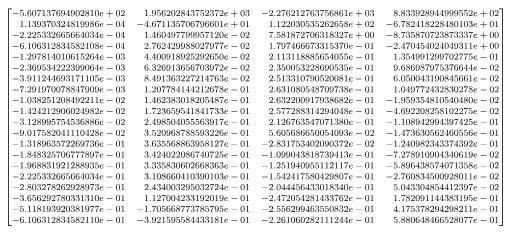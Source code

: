 \documentclass{article}
\begin{document}
\begin{adjustwidth}{-2em}{-2em}
    \[ \medmath{\begin{bmatrix*}[r]
-5.607137694902810e+02 & 1.956202843752372e+03 & -2.276212763756861e+03 & 8.833928944999552e+02 \\
1.139370324819986e-04 & -4.671135706796601e+01 & 1.122030535262658e+02 & -6.782418228480103e+01 \\
-2.225332665664034e-04 & 1.460497799957120e-02 & 7.581872706318327e+00 & -8.735870723873337e+00 \\
-6.106312834582108e-04 & 2.762429988027977e-02 & 1.797466673315370e-01 & -2.470454024049311e+00 \\
-1.297814010615264e-03 & 4.400918925292650e-02 & 2.113118885654055e-01 & 1.354991299702775e-01 \\
-2.369534222399064e-03 & 6.326913656703972e-02 & 2.350053228690535e-01 & 9.686987975376644e-02 \\
-3.911244693171105e-03 & 8.491363227214763e-02 & 2.513310790520081e-01 & 6.050043190845661e-02 \\
-7.291970078847909e-03 & 1.207784144212678e-01 & 2.631080548709738e-01 & 1.049772432830278e-02 \\
-1.038251208492211e-02 & 1.462383018205487e-01 & 2.632200917938682e-01 & -1.959354810540480e-02 \\
-1.424212906024982e-02 & 1.723659541841733e-01 & 2.577288314294048e-01 & -4.692208258102275e-02 \\
-3.128995754536886e-02 & 2.498504055563917e-01 & 2.126763547071380e-01 & -1.108942994397425e-01 \\
-9.017582041110428e-02 & 3.520968788593226e-01 & 5.605686650054093e-02 & -1.473630562460556e-01 \\
-1.318963572269736e-01 & 3.635568863958127e-01 & -2.831753402090372e-02 & -1.240982343374392e-01 \\
-1.848325706777897e-01 & 3.424022086740725e-01 & -1.099043818739413e-01 & -7.278910904340619e-02 \\
-1.968831921288935e-01 & 3.335830602668363e-01 & -1.251940955112117e-01 & -5.896438574071358e-02 \\
-2.225332665664034e-01 & 3.108660410390103e-01 & -1.542417580429807e-01 & -2.760834500928011e-02 \\
-2.803278262928973e-01 & 2.434003295032724e-01 & -2.044456433018340e-01 & 5.043304854412397e-02 \\
-3.656292780331310e-01 & 1.127004233192019e-01 & -2.472054281433762e-01 & 1.782091144383195e-01 \\
-5.118193920381977e-01 & -1.705668773785795e-01 & -2.556299463550832e-01 & 4.175378294298211e-01 \\
-6.106312834582110e-01 & -3.921595584433181e-01 & -2.261060282111244e-01 & 5.880648466528077e-01 \\
\end{bmatrix*}} \]%
\end{adjustwidth}
\end{document}
